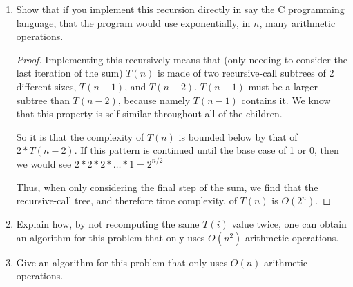 \documentclass{article}
\begin{document}
	\begin{enumerate}[label=(\alph*)]
		\item Show that if you implement this recursion directly in say the C programming language, that the
		program would use exponentially, in $n$, many arithmetic operations.

		
		\begin{proof}
			Implementing this recursively means that (only needing to consider the last iteration of the sum) $T(n)$ is made of two recursive-call subtrees of 2 different sizes, $T(n-1)$, and $T(n-2)$.
			$T(n-1)$ must be a larger subtree than $T(n-2)$, because namely $T(n-1)$ contains it.
			We know that this property is self-similar throughout all of the children.

			So it is that the complexity of $T(n)$ is bounded below by that of $2*T(n-2)$.
			If this pattern is continued until the base case of 1 or 0, then we would see $2*2*2*\dots*1 = 2^{n/2}$
			
			Thus, when only considering the final step of the sum, we find that the recursive-call tree, and therefore time complexity, of $T(n)$ is $O(2^n)$.
		\end{proof}
	
		\item Explain how, by not recomputing the same $T(i)$ value twice, one can obtain an algorithm for this
		problem that only uses $O(n^2)$ arithmetic operations.

		
		\item Give an algorithm for this problem that only uses $O(n)$ arithmetic operations.
	\end{enumerate}
	
	
\end{document}
